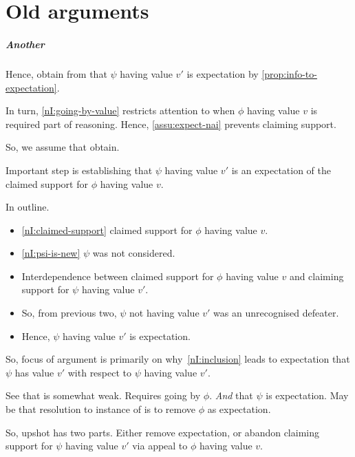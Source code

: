 \chapter{Old \nI{} arguments}

\paragraph{Another}

\begin{note}
  Hence, obtain from \nIBackground{} that \(\psi\) having value \(v'\) is expectation by \autoref{prop:info-to-expectation}.

  In turn, \ref{nI:going-by-value} restricts attention to when \(\phi\) having value \(v\) is required part of reasoning.
  Hence, \autoref{assu:expect-nai} prevents claiming support.
\end{note}

\begin{note}
  So, we assume that \nIBackground{} obtain.

  Important step is establishing that \(\psi\) having value \(v'\) is an expectation of the claimed support for \(\phi\) having value \(v\).

  In outline.
  \begin{itemize}
  \item \ref{nI:claimed-support} claimed support for \(\phi\) having value \(v\).
  \item \ref{nI:psi-is-new} \(\psi\) was not considered.
  \item Interdependence between claimed support for \(\phi\) having value \(v\) and claiming support for \(\psi\) having value \(v'\).
  \item So, from previous two, \(\psi\) not having value \(v'\) was an unrecognised defeater.
  \item Hence, \(\psi\) having value \(v'\) is expectation.
  \end{itemize}
\end{note}

\begin{note}
  So, focus of argument is primarily on why~\ref{nI:inclusion} leads to expectation that \(\psi\) has value \(v'\) with respect to \(\psi\) having value \(v'\).
\end{note}

\begin{note}
  See that \nI{} is somewhat weak.
  Requires going by \(\phi\).
  \emph{And} that \(\psi\) is expectation.
  May be that resolution to instance of \nI{} is to remove \(\phi\) as expectation.

  So, upshot has two parts.
  Either remove expectation, or abandon claiming support for \(\psi\) having value \(v'\) via appeal to \(\phi\) having value \(v\).
\end{note}

